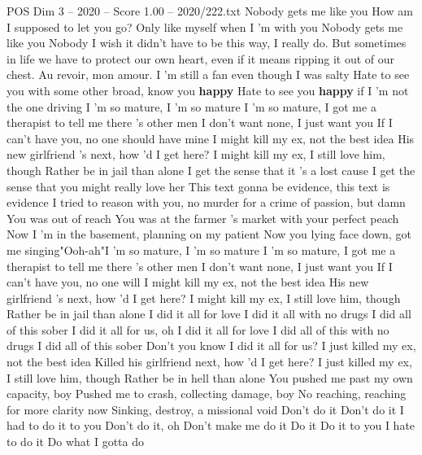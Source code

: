 \begin{textsample}{POS Dim 3 – 2020 – Score 1.00 – 2020/222.txt}  \label{ex:f3_pos_016}
Nobody gets me like you How am I supposed to let you go?
Only like myself when I 'm with you Nobody gets me like you Nobody I wish it didn't have to be this way, I really do.
But sometimes in life we have to protect our own heart, even if it means ripping it out of our chest.
Au revoir, mon amour.
I 'm still a fan even though I was salty Hate to see you with some other broad, know you \textbf{happy} Hate to see you \textbf{happy} if I 'm not the one driving I 'm so mature, I 'm so mature I 'm so mature, I got me a therapist to tell me there 's other men I don't want none, I just want you If I can't have you, no one should have mine I might kill my ex, not the best idea His new girlfriend 's next, how 'd I get here?
I might kill my ex, I still love him, though Rather be in jail than alone I get the sense that it 's a lost cause I get the sense that you might really love her This text gonna be evidence, this text is evidence I tried to reason with you, no murder for a crime of passion, but damn You was out of reach You was at the farmer 's market with your perfect peach Now I 'm in the basement, planning on my patient Now you lying face down, got me singing"Ooh-ah"I 'm so mature, I 'm so mature I 'm so mature, I got me a therapist to tell me there 's other men I don't want none, I just want you If I can't have you, no one will I might kill my ex, not the best idea His new girlfriend 's next, how 'd I get here?
I might kill my ex, I still love him, though Rather be in jail than alone I did it all for love I did it all with no drugs I did all of this sober I did it all for us, oh I did it all for love I did all of this with no drugs I did all of this sober Don't you know I did it all for us?
I just killed my ex, not the best idea Killed his girlfriend next, how 'd I get here?
I just killed my ex, I still love him, though Rather be in hell than alone You pushed me past my own capacity, boy Pushed me to crash, collecting damage, boy No reaching, reaching for more clarity now Sinking, destroy, a missional void Don't do it Don't do it I had to do it to you Don't do it, oh Don't make me do it Do it Do it to you I hate to do it Do what I gotta do

\end{textsample}
